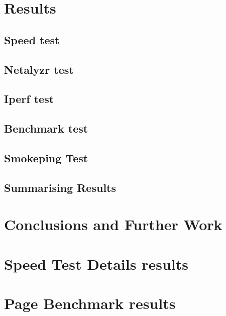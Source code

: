 \documentclass[letter, 11pt]{article}
\theoremstyle{plain}
\theoremstyle{definition}
\begin{document}
\newpage
\section{Results}


\subsection{Speed test}


\subsection{Netalyzr test}


\subsection{Iperf test}


\subsection{Benchmark test}


\subsection{Smokeping Test}


\subsection{Summarising Results}

\newpage
\section{Conclusions and Further Work}

\newpage
{}
\newpage
\begin{appendix}
\section{Speed Test Details results}\label{app:bwmeasures}

\newpage
\section{Page Benchmark results}\label{app:pbmeasures}

\end{appendix}
\end{document}
